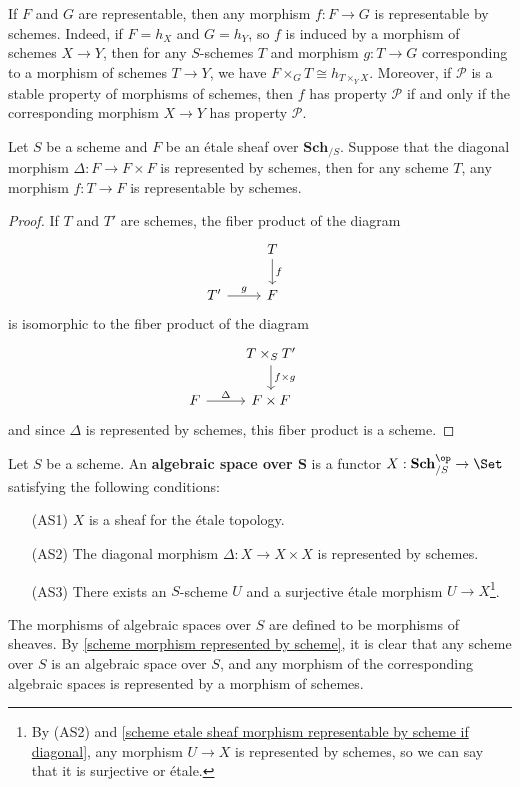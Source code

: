 \begin{example}\label{scheme morphism represented by scheme}
If $F$ and $G$ are representable, then any morphism $f:F\to G$ is representable by schemes. Indeed, if $F=h_X$ and $G=h_Y$, so $f$ is induced by a morphism of schemes $X\to Y$, then for any $S$-schemes $T$ and morphism $g:T\to G$ corresponding to a morphism of schemes $T\to Y$, we have $F\times_GT\cong h_{T\times_YX}$. Moreover, if $\mathcal{P}$ is a stable property of morphisms of schemes, then $f$ has property $\mathcal{P}$ if and only if the corresponding morphism $X\to Y$ has property $\mathcal{P}$.
\end{example}

\begin{proposition}\label{scheme etale sheaf morphism representable by scheme if diagonal}
Let $S$ be a scheme and $F$ be an \'etale sheaf over $\mathbf{Sch}_{/S}$. Suppose that the diagonal morphism $\Delta:F\to F\times F$ is represented by schemes, then for any scheme $T$, any morphism $f:T\to F$ is representable by schemes.
\end{proposition}
\begin{proof}
If $T$ and $T'$ are schemes, the fiber product of the diagram
\[\begin{tikzcd}
&T\ar[d,"f"]&\\
T'\ar[r,"g"]&F
\end{tikzcd}\]
is isomorphic to the fiber product of the diagram
\[\begin{tikzcd}
&T\times_ST'\ar[d,"f\times g"]&\\
F\ar[r,"\Delta"]&F\times F
\end{tikzcd}\]
and since $\Delta$ is represented by schemes, this fiber product is a scheme.
\end{proof}

Let $S$ be a scheme. An \textbf{algebraic space over $\bm{S}$} is a functor $X:\mathbf{Sch}_{/S}^{\op}\to \Set$ satisfying the following conditions:
\begin{enumerate}[leftmargin=40pt]
    \item[(AS1)] $X$ is a sheaf for the \'etale topology.
    \item[(AS2)] The diagonal morphism $\Delta:X\to X\times X$ is represented by schemes.
    \item[(AS3)] There exists an $S$-scheme $U$ and a surjective \'etale morphism $U\to X$\footnote{By (AS2) and \cref{scheme etale sheaf morphism representable by scheme if diagonal}, any morphism $U\to X$ is represented by schemes, so we can say that it is surjective or \'etale.}.
\end{enumerate}
The morphisms of algebraic spaces over $S$ are defined to be morphisms of sheaves. By \cref{scheme morphism represented by scheme}, it is clear that any scheme over $S$ is an algebraic space over $S$, and any morphism of the corresponding algebraic spaces is represented by a morphism of schemes.\par

